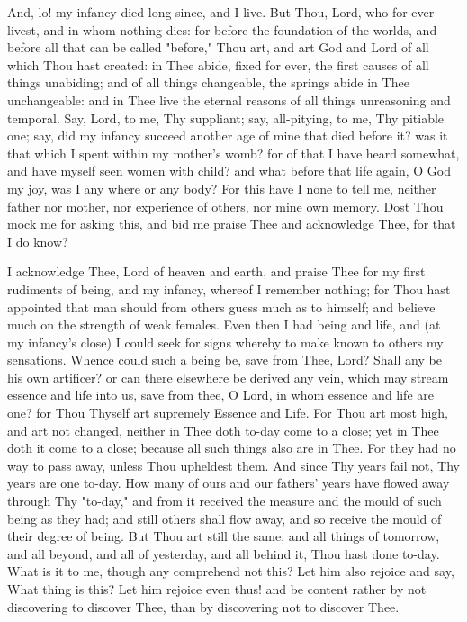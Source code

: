 \documentclass[b5paper,openright,12pt,twoside]{book}
\begin{document}
And, lo! my infancy died long since, and I live. But Thou, Lord, who for
ever livest, and in whom nothing dies: for before the foundation of the
worlds, and before all that can be called "before," Thou art, and art
God and Lord of all which Thou hast created: in Thee abide, fixed
for ever, the first causes of all things unabiding; and of all things
changeable, the springs abide in Thee unchangeable: and in Thee live the
eternal reasons of all things unreasoning and temporal. Say, Lord, to
me, Thy suppliant; say, all-pitying, to me, Thy pitiable one; say, did
my infancy succeed another age of mine that died before it? was it
that which I spent within my mother's womb? for of that I have heard
somewhat, and have myself seen women with child? and what before that
life again, O God my joy, was I any where or any body? For this have I
none to tell me, neither father nor mother, nor experience of others,
nor mine own memory. Dost Thou mock me for asking this, and bid me
praise Thee and acknowledge Thee, for that I do know?

I acknowledge Thee, Lord of heaven and earth, and praise Thee for my
first rudiments of being, and my infancy, whereof I remember nothing;
for Thou hast appointed that man should from others guess much as to
himself; and believe much on the strength of weak females. Even then I
had being and life, and (at my infancy's close) I could seek for signs
whereby to make known to others my sensations. Whence could such a being
be, save from Thee, Lord? Shall any be his own artificer? or can there
elsewhere be derived any vein, which may stream essence and life into
us, save from thee, O Lord, in whom essence and life are one? for Thou
Thyself art supremely Essence and Life. For Thou art most high, and art
not changed, neither in Thee doth to-day come to a close; yet in Thee
doth it come to a close; because all such things also are in Thee. For
they had no way to pass away, unless Thou upheldest them. And since
Thy years fail not, Thy years are one to-day. How many of ours and
our fathers' years have flowed away through Thy "to-day," and from it
received the measure and the mould of such being as they had; and still
others shall flow away, and so receive the mould of their degree of
being. But Thou art still the same, and all things of tomorrow, and all
beyond, and all of yesterday, and all behind it, Thou hast done to-day.
What is it to me, though any comprehend not this? Let him also rejoice
and say, What thing is this? Let him rejoice even thus! and be content
rather by not discovering to discover Thee, than by discovering not to
discover Thee.
\end{document}

